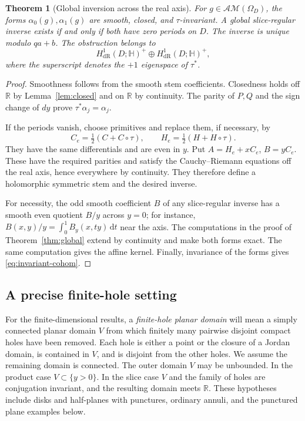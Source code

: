 \documentclass[11pt,a4paper]{article}
\numberwithin{equation}{section}
\newtheorem{theorem}{Theorem}[section]
\theoremstyle{definition}
\theoremstyle{remark}
\newcommand{\R}{\mathbb R}
\newcommand{\HH}{\mathbb H}
\newcommand{\AM}{\mathcal{AM}}
\newcommand{\dd}{\,\mathrm d}
\begin{document}
\begin{theorem}[Global inversion across the real axis]\label{thm:real-axis}
For $g\in\AM(\Omega_D)$, the forms $\alpha_0(g),\alpha_1(g)$ are smooth,
closed, and $\tau$-invariant. A global slice-regular inverse exists if and only
if both have zero periods on $D$. The inverse is unique modulo $qa+b$.
The obstruction belongs to
\begin{equation}\label{eq:invariant-cohom}
 H^1_{\mathrm{dR}}(D;\HH)^+\oplus H^1_{\mathrm{dR}}(D;\HH)^+,
\end{equation}
where the superscript denotes the $+1$ eigenspace of $\tau^*$.
\end{theorem}
\begin{proof}
Smoothness follows from the smooth stem coefficients. Closedness holds off
$\R$ by Lemma~\ref{lem:closed} and on $\R$ by continuity. The parity of $P,Q$
and the sign change of $dy$ prove $\tau^*\alpha_j=\alpha_j$.

If the periods vanish, choose primitives and replace them, if necessary, by
\[
 C_e=\tfrac12(C+C\circ\tau),\qquad
 H_e=\tfrac12(H+H\circ\tau).
\]
They have the same differentials and are even in $y$. Put
$A=H_e+xC_e$, $B=yC_e$. These have the required parities and satisfy the
Cauchy--Riemann equations off the real axis, hence everywhere by continuity.
They therefore define a holomorphic symmetric stem and the desired inverse.

For necessity, the odd smooth coefficient $B$ of any slice-regular inverse
has a smooth even quotient $B/y$ across $y=0$; for instance,
$B(x,y)/y=\int_0^1B_y(x,ty)\dd t$ near the axis. The computations in the
proof of Theorem~\ref{thm:global} extend by continuity and make both forms exact.
The same computation gives the affine kernel. Finally, invariance of the
forms gives \eqref{eq:invariant-cohom}.
\end{proof}

\subsection{A precise finite-hole setting}
For the finite-dimensional results, a \emph{finite-hole planar domain} will mean
a simply connected planar domain $V$ from which finitely many pairwise disjoint
compact holes have been removed. Each hole is either a point or the closure of
a Jordan domain, is contained in $V$, and is disjoint from the other holes.
We assume the remaining domain is connected. The outer domain $V$ may be
unbounded. In the product case $V\subset\{y>0\}$. In the slice case $V$ and
the family of holes are conjugation invariant, and the resulting domain meets
$\R$. These hypotheses include disks and half-planes with punctures, ordinary
annuli, and the punctured plane examples below.
\end{document}
